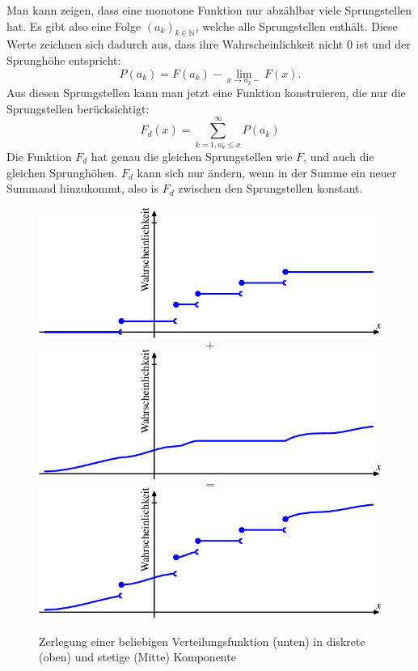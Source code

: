 Man kann zeigen, dass eine monotone Funktion nur abzählbar viele Sprungstellen
hat.
Es gibt also eine Folge $(a_k)_{k\in\mathbb{N}}$, welche alle
Sprungstellen enthält.
Diese Werte zeichnen sich dadurch aus, dass ihre
Wahrscheinlichkeit nicht $0$ ist und der Sprunghöhe entspricht:
\[
P(a_k)=F(a_k)-\lim_{x\to a_k-}F(x).
\]
Aus diesen Sprungstellen kann man jetzt eine Funktion konstruieren,
die nur die Sprungstellen berücksichtigt:
\[
F_d(x)=\sum_{k=1, a_k\le x}^\infty P(a_k)
\]
Die Funktion $F_d$ hat genau die gleichen Sprungstellen wie $F$, und
auch die gleichen Sprunghöhen.
$F_d$ kann sich nur ändern, wenn in der
Summe ein neuer Summand hinzukommt, also is $F_d$ zwischen den Sprungstellen
konstant.

\begin{figure}
\begin{center}
\includegraphics{images/verteilungsfunktion-3}
\[
+
\]
\includegraphics{images/verteilungsfunktion-4}
\[
=
\]
\includegraphics{images/verteilungsfunktion-2}
\end{center}
\caption{Zerlegung einer beliebigen Verteilungsfunktion (unten) in diskrete (oben)
und stetige (Mitte) Komponente\label{bildzerlegungverteilungsfunktion}}
\end{figure}

